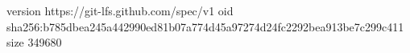 version https://git-lfs.github.com/spec/v1
oid sha256:b785dbea245a442990ed81b07a774d45a97274d24fc2292bea913be7c299c411
size 349680
